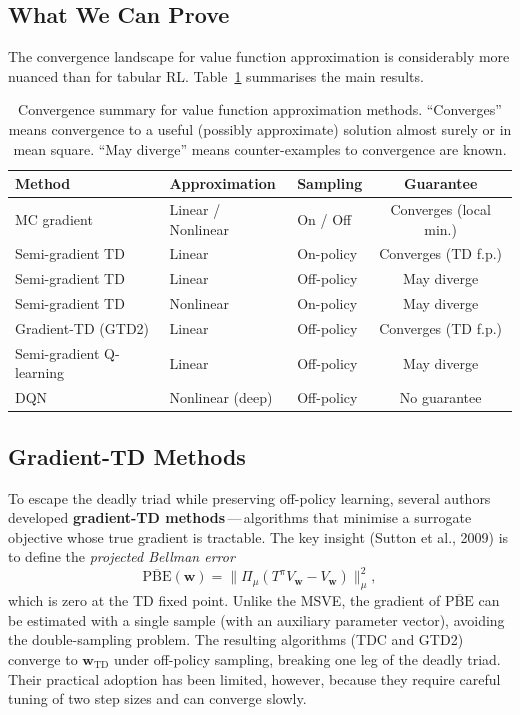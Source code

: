 \subsection{What We Can Prove}

The convergence landscape for value function approximation is considerably more nuanced than for
tabular RL.  Table~\ref{tab:convergence-summary} summarises the main results.

\begin{table}[ht]
\centering
\caption{Convergence summary for value function approximation methods.  ``Converges'' means
convergence to a useful (possibly approximate) solution almost surely or in mean square.
``May diverge'' means counter-examples to convergence are known.}
\label{tab:convergence-summary}
\renewcommand{\arraystretch}{1.25}
\begin{tabular}{lllc}
\toprule
\textbf{Method} & \textbf{Approximation} & \textbf{Sampling} & \textbf{Guarantee} \\
\midrule
MC gradient & Linear / Nonlinear & On / Off & Converges (local min.) \\
Semi-gradient TD & Linear & On-policy & Converges (TD f.p.) \\
Semi-gradient TD & Linear & Off-policy & May diverge \\
Semi-gradient TD & Nonlinear & On-policy & May diverge \\
Gradient-TD (GTD2) & Linear & Off-policy & Converges (TD f.p.) \\
Semi-gradient Q-learning & Linear & Off-policy & May diverge \\
DQN & Nonlinear (deep) & Off-policy & No guarantee \\
\bottomrule
\end{tabular}
\end{table}

\subsection{Gradient-TD Methods}

To escape the deadly triad while preserving off-policy learning, several authors developed
\textbf{gradient-TD methods}\,---\,algorithms that minimise a
surrogate objective whose true gradient is tractable.  The key insight (Sutton et al., 2009) is
to define the \emph{projected Bellman error}
\[
\overline{\mathrm{PBE}}(\mathbf{w}) = \|\Pi_\mu(T^\pi V_\mathbf{w} - V_\mathbf{w})\|_\mu^2,
\]
which is zero at the TD fixed point.  Unlike the MSVE, the gradient of $\overline{\mathrm{PBE}}$
can be estimated with a single sample (with an auxiliary parameter vector), avoiding the
double-sampling problem.  The resulting algorithms (TDC and GTD2) converge to $\mathbf{w}_{\mathrm{TD}}$
under off-policy sampling, breaking one leg of the deadly triad.  Their practical adoption has
been limited, however, because they require careful tuning of two step sizes and can converge
slowly.

